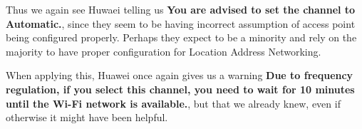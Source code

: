 \documentclass[../wifi-security.tex]{subfiles}
\begin{document}
Thus we again see Huwaei telling us \textbf{You are advised to set the channel to Automatic.}, since they seem to be having incorrect assumption of access point being configured properly. Perhaps they expect to be a minority and rely on the majority to have proper configuration for Location Address Networking.

When applying this, Huawei once again gives us a warning \textbf{Due to frequency regulation, if you select this channel, you need to wait for 10 minutes until the Wi-Fi network is available.}, but that we already knew, even if otherwise it might have been helpful.

\end{document}
